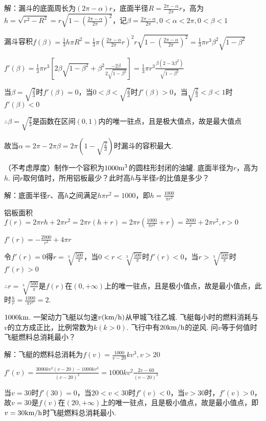 \documentclass[12pt,UTF8]{ctexart}
\begin{document}
\begin{enumerate}
解：漏斗的底面周长为$(2\pi-\alpha)r$，底面半径$R=\frac{2\pi-\alpha}{2\pi}r$，高为$h=\sqrt{r^2-R^2}=r\sqrt{1-(\frac{2\pi-\alpha}{2\pi})^2}$，记$\beta=\frac{2\pi-\alpha}{2\pi},0<\alpha<2\pi,0<\beta<1$

漏斗容积$f(\beta)=\frac13h\pi R^2=\frac13\pi(\frac{2\pi-\alpha}{2\pi}r)^2r\sqrt{1-(\frac{2\pi-\alpha}{2\pi})^2}=\frac13\pi r^3\beta^2\sqrt{1-\beta^2}$

$f'(\beta)=\frac13\pi r^3[2\beta\sqrt{1-\beta^2}+\beta^2\frac{-2\beta}{2\sqrt{1-\beta^2}}]=\frac13\pi r^3\frac{\beta(2-3\beta^2)}{\sqrt{1-\beta^2}}$

当$\beta=\sqrt{\frac23}$时$f'(\beta)=0$，当$0<\beta<\sqrt{\frac23}$时$f'(\beta)>0$，当$\sqrt{\frac23}<\beta<1$时$f'(\beta)<0$

$\therefore\beta=\sqrt{\frac23}$是函数在区间$(0,1)$内的唯一驻点，且是极大值点，故是最大值点

故当$\alpha=2\pi-2\pi\beta=2\pi(1-\sqrt{\frac23})$时漏斗的容积最大.

（不考虑厚度）制作一个容积为$1000\rm m^3$的圆柱形封闭的油罐. 底面半径为$r$，高为$h$. 问$r$取何值时，所用铝板最少？此时高$h$与半径$r$的比值是多少？

解：底面半径$r$、高$h$之间满足$h\pi r^2=1000$，即$h=\frac{1000}{\pi r^2}$

铝板面积$f(r)=2\pi rh+2\pi r^2=2\pi r(h+r)=2\pi r(\frac{1000}{\pi r^2}+r)=\frac{2000}r+2\pi r^2,r>0$

$f'(r)=-\frac{2000}{r^2}+4\pi r$

令$f'(r)=0$得$r=\sqrt[3]{\frac{500}\pi}$，当$0<r<\sqrt[3]{\frac{500}\pi}$时$f'(r)<0$，当$r>\sqrt[3]{\frac{500}\pi}$时$f'(r)>0$

$\therefore r=\sqrt[3]{\frac{500}\pi}$是$f(r)$在$(0,+\infty)$上的唯一驻点，且是极小值点，故是最小值点，此时$\frac hr=\frac{1000}{\pi r^3}=2$.

$1000\rm km$. 一架动力飞艇以匀速$v({\rm km/h})$从甲城飞往乙城. 飞艇每小时的燃料消耗与$v$的立方成正比，比例常数为$k(k>0)$. 飞行中有$20\rm km/h$的逆风. 问$v$等于何值时飞艇燃料总消耗最小？

解：飞艇的燃料总消耗为$f(v)=\frac{1000}{v-20}kv^3,v>20$

$f'(v)=\frac{3000kv^2(v-20)-1000kv^3}{(v-20)^2}=1000kv^2\frac{2v-60}{(v-20)^2}$

当$v=30$时$f'(30)=0$，当$20<v<30$时$f'(v)<0$，当$v>30$时，$f'(v)>0$，故$v=30$是$f(v)$在$(20,+\infty)$上的唯一驻点，且是极小值点，故是最小值点，即$v=30{\rm km/h}$时飞艇燃料总消耗最小.


\end{enumerate}
\end{document}

